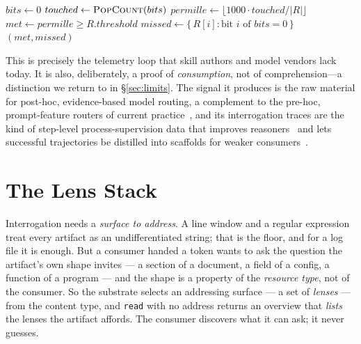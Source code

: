 \documentclass[10pt,twocolumn]{article}
\newcommand{\tok}[1]{\texttt{#1}}
\begin{document}
\begin{algorithm}[t]
\small
\caption{Contract coverage. A pure fold; misses are named, never
silent.}
\label{alg:coverage}
\DontPrintSemicolon
{}
$bits \leftarrow 0$\;
$touched \leftarrow \textsc{PopCount}(bits)$\;
$permille \leftarrow \lfloor 1000 \cdot touched / |R| \rfloor$\;
$met \leftarrow permille \geq R.threshold$\;
$missed \leftarrow \{\, R[i] : \text{bit } i \text{ of } bits = 0 \,\}$\;
\Return $(met, missed)$\;
\end{algorithm}

This is precisely the telemetry loop that skill authors and model vendors
lack today. It is also, deliberately, a proof of \emph{consumption}, not
of comprehension---a distinction we return to in \S\ref{sec:limits}. The
signal it produces is the raw material for post-hoc, evidence-based model
routing, a complement to the pre-hoc, prompt-feature routers of current
practice~\citep{ong2024}, and its interrogation traces are the kind of
step-level process-supervision data that improves
reasoners~\citep{lightman2023,jin2025} and lets successful trajectories be
distilled into scaffolds for weaker consumers~\citep{wang2024awm}.

\section{The Lens Stack}
\label{sec:lenses}

Interrogation needs a \emph{surface to address}. A line window and a regular
expression treat every artifact as an undifferentiated string; that is the floor,
and for a log file it is enough. But a consumer handed a token wants to ask the
question the artifact's own shape invites --- a section of a document, a field of a
config, a function of a program --- and the shape is a property of the
\emph{resource type}, not of the consumer. So the substrate selects an addressing
surface --- a set of \emph{lenses} --- from the content type, and \tok{read} with no
address returns an overview that \emph{lists} the lenses the artifact affords. The
consumer discovers what it can ask; it never guesses.
\end{document}
